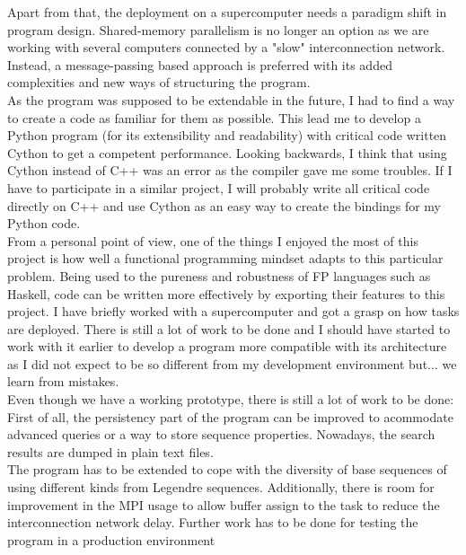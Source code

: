 \documentclass{tfg_domingo}
\newcommand{\domingo}[1]{}
\begin{document}
  Apart from that, the deployment on a
  supercomputer needs a paradigm shift in program design. Shared-memory
  parallelism is no longer an option as we are working with several computers
  connected by a "slow" interconnection network. Instead, a message-passing
  based approach is preferred with its added complexities and new ways of
  structuring the program.\\

  As the program was supposed to be extendable in the future, I had to
  find a way to create a code as familiar for them as possible. This lead me to
  develop a Python program (for its extensibility and readability) with
  critical code written Cython to get a competent performance. Looking
  backwards, I think that using Cython instead of C++ was an error as the
  compiler gave me some troubles. If I have to participate in a similar project,
  I will probably write all critical code directly on C++ and use Cython as
  an easy way to create the bindings for my Python code.\\

 From a personal point of view,  one of the things I enjoyed the most of this project is how well a
  functional programming mindset adapts to this particular problem. Being
  used to the pureness and robustness of FP languages such as Haskell,
  code can be written more effectively by exporting their features to this
  project.  I have briefly worked with a supercomputer and got a grasp
  on how tasks are deployed. There is still a lot of work to be done and I
  should have started to work with it earlier to develop a program more
  compatible with its architecture as I did not expect to be so different from
  my development environment but... we learn from mistakes. \domingo{Yo no te recomendaria decir esto, puede afectar negativamente a la percepción del trabajo}\\


 Even though we have a working prototype, there is still a lot of work to be done:\\

  First of all, the persistency part of the program can be improved to acommodate advanced queries or a way to store sequence properties.
  Nowadays, the search results are dumped in plain text files.\\

  The program has to be extended to cope with the diversity of base sequences of using different kinds from Legendre sequences. Additionally, there is room for improvement in the MPI usage to allow buffer assign to the task  to reduce the interconnection network delay.  Further work has to be done for testing the program in a production environment\\
\end{document}
